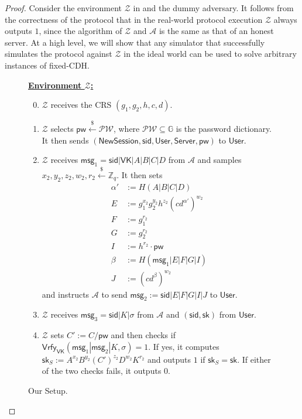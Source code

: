 \documentclass[10pt,a4paper]{article}
\newcommand{\env}{\mathcal{Z}}
\newcommand{\adv}{\mathcal{A}}
\newcommand{\user}{\mathsf{User}}
\newcommand{\sk}{\mathsf{sk}}
\newcommand{\pw}{\mathsf{pw}}
\newcommand{\newsession}{\mathsf{NewSession}}
\newcommand{\server}{\mathsf{Server}}
\newcommand{\msg}[1]{\mathsf{msg}_{#1}}
\begin{document}
	\begin{proof}
	
	Consider the environment $\env$ in  and the dummy adversary. It follows from the correctness of the protocol that in the real-world protocol execution $\env$ always outputs $1$, since the algorithm of $\env$ and $\adv$ is the same as that of an honest server. At a high level, we will show that any simulator that successfully simulates the protocol against $\env$ in the ideal world can be used to solve arbitrary instances of fixed-CDH.
	
	\begin{figure}[h]
		\begin{framed}
			\vspace{2mm}
			\textbf{\underline{Environment $\env$:}}
			\begin{enumerate}\setcounter{enumi}{-1}
                \item $\env$ receives the CRS $(g_1, g_2, h, c, d)$.
				\item $\env$ selects $\pw\xleftarrow{\$}\mathcal{PW}$, where $\mathcal{PW}\subseteq\mathbb{G}$ is the password dictionary. It then sends $(\newsession,\mathsf{sid},\user,\server,\pw)$ to $\user$.
				\item $\env$ receives $\msg{1} = \mathsf{sid}|\mathsf{VK}|A|B|C|D$ from $\adv$ and samples $x_2, y_2, z_2, w_2, r_2\xleftarrow{\$}\mathbb{Z}_q$. It then sets 
				\begin{align*}
					\alpha'&:=H(A|B|C|D)\\
					E &:= g_1^{x_2}g_2^{y_2}h^{z_2}(cd^{\alpha'})^{w_2}\\
					F &:= g_1^{r_2}\\
					G &:= g_2^{r_2}\\
					I &:= h^{r_2}\cdot\pw\\
					\beta &:= H(\msg{1}|E|F|G|I)\\
					J &:= (cd^{\beta})^{w_2}
				\end{align*}
			and instructs $\adv$ to send $\msg{2} := \mathsf{sid}|E|F|G|I|J$ to $\user$. 
			\item $\env$ receives $\msg{3}=\mathsf{sid}|K|\sigma$ from $\adv$ and $(\mathsf{sid}, \sk)$ from $\user$.
			\item $\env$ sets $C':=C/\pw$ and then checks if $\mathsf{Vrfy}_{\mathsf{VK}}(\msg{1}|\msg{2}|K,\sigma)=1$. If yes, it computes $\sk_S:=A^{x_2}B^{y_2}(C')^{z_2}D^{w_2}K^{r_2}$ and outputs $1$ if $\sk_S=\sk$. If either of the two checks fails, it outputs $0$.
			\end{enumerate}
			\vspace{2mm}
		\end{framed}
		\caption{Our Setup.}
		\label{fig:adv}
	\end{figure}


\end{proof}
\end{document}
